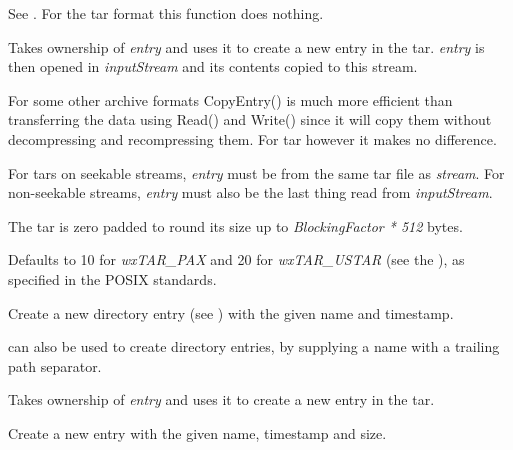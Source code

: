 \label{wxtaroutputstreamcopyarchivemetadata}


See .
For the tar format this function does nothing.


\label{wxtaroutputstreamcopyentry}


Takes ownership of {\it entry} and uses it to create a new entry
in the tar. {\it entry} is then opened in {\it inputStream} and its contents
copied to this stream.

For some other archive formats CopyEntry() is much more efficient than
transferring the data using Read() and Write() since it will copy them
without decompressing and recompressing them. For tar however it makes
no difference.

For tars on seekable streams, {\it entry} must be from the same tar file
as {\it stream}. For non-seekable streams, {\it entry} must also be the
last thing read from {\it inputStream}.


\label{wxtaroutputstreamblockingfactor}



The tar is zero padded to round its size up to {\it BlockingFactor * 512} bytes.

Defaults to 10 for {\it wxTAR\_PAX} and 20 for {\it wxTAR\_USTAR}
(see the ), as
specified in the POSIX standards.


\label{wxtaroutputstreamputnextdirentry}


Create a new directory entry
(see )
with the given name and timestamp.

 can
also be used to create directory entries, by supplying a name with
a trailing path separator.


\label{wxtaroutputstreamputnextentry}


Takes ownership of {\it entry} and uses it to create a new entry
in the tar. 


Create a new entry with the given name, timestamp and size.

